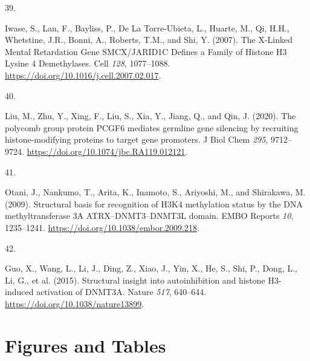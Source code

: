 \documentclass[
]{article}
\newlength{\cslhangindent}
\newlength{\csllabelwidth}
\newlength{\cslentryspacingunit} %
\newenvironment{CSLReferences}[2] %
 {%
  \setlength{\parindent}{0pt}
  \ifodd #1
  \let\oldpar\par
  \def\par{\hangindent=\cslhangindent\oldpar}
  \fi
  \setlength{\parskip}{#2\cslentryspacingunit}
 }%
 {}
\newcommand{\CSLLeftMargin}[1]{\parbox[t]{\csllabelwidth}{#1}}
\newcommand{\CSLRightInline}[1]{\parbox[t]{\linewidth - \csllabelwidth}{#1}\break}
\begin{document}
\begin{CSLReferences}{0}{0}
\leavevmode{}%
\CSLLeftMargin{39. }%
\CSLRightInline{Iwase, S., Lan, F., Bayliss, P., De La Torre-Ubieta, L.,
Huarte, M., Qi, H.H., Whetstine, J.R., Bonni, A., Roberts, T.M., and
Shi, Y. (2007). The {X-Linked Mental Retardation Gene SMCX}/{JARID1C
Defines} a {Family} of {Histone H3 Lysine} 4 {Demethylases}. Cell
\emph{128}, 1077--1088.
\url{https://doi.org/10.1016/j.cell.2007.02.017}.}

\leavevmode{}%
\CSLLeftMargin{40. }%
\CSLRightInline{Liu, M., Zhu, Y., Xing, F., Liu, S., Xia, Y., Jiang, Q.,
and Qin, J. (2020). The polycomb group protein {PCGF6} mediates germline
gene silencing by recruiting histone-modifying proteins to target gene
promoters. J Biol Chem \emph{295}, 9712--9724.
\url{https://doi.org/10.1074/jbc.RA119.012121}.}

\leavevmode{}%
\CSLLeftMargin{41. }%
\CSLRightInline{Otani, J., Nankumo, T., Arita, K., Inamoto, S.,
Ariyoshi, M., and Shirakawa, M. (2009). Structural basis for recognition
of {H3K4} methylation status by the {DNA} methyltransferase {3A
ATRX}--{DNMT3}--{DNMT3L} domain. EMBO Reports \emph{10}, 1235--1241.
\url{https://doi.org/10.1038/embor.2009.218}.}

\leavevmode{}%
\CSLLeftMargin{42. }%
\CSLRightInline{Guo, X., Wang, L., Li, J., Ding, Z., Xiao, J., Yin, X.,
He, S., Shi, P., Dong, L., Li, G., et al. (2015). Structural insight
into autoinhibition and histone {H3-induced} activation of {DNMT3A}.
Nature \emph{517}, 640--644. \url{https://doi.org/10.1038/nature13899}.}

\end{CSLReferences}

\newpage

\hypertarget{figures-and-tables}{%
\section{Figures and Tables}\label{figures-and-tables}}
\end{document}
